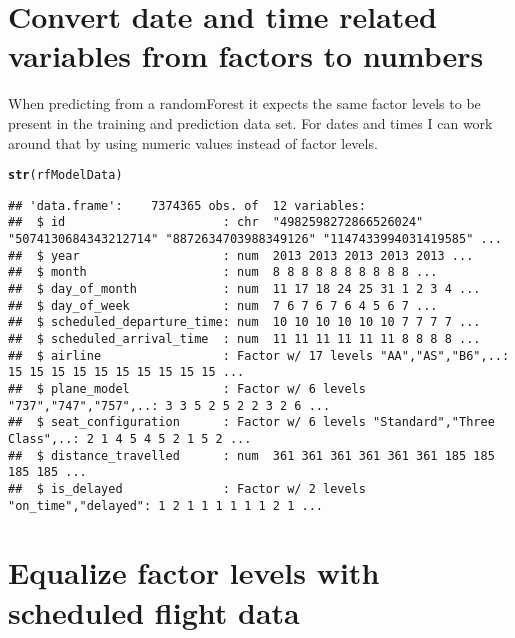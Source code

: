 \documentclass{article}\usepackage[]{graphicx}\usepackage[]{color}
\makeatletter
\newcommand{\hlstd}[1]{\textcolor[rgb]{0.345,0.345,0.345}{#1}}%
\newcommand{\hlkwd}[1]{\textcolor[rgb]{0.737,0.353,0.396}{\textbf{#1}}}%
\newenvironment{kframe}{%
 \def\at@end@of@kframe{}%
 \ifinner\ifhmode%
  \def\at@end@of@kframe{\end{minipage}}%
  \begin{minipage}{\columnwidth}%
 \fi\fi%
 \def\FrameCommand##1{\hskip\@totalleftmargin \hskip-\fboxsep
 \colorbox{shadecolor}{##1}\hskip-\fboxsep
     \hskip-\linewidth \hskip-\@totalleftmargin \hskip\columnwidth}%
 \MakeFramed {\advance\hsize-\width
   \@totalleftmargin\z@ \linewidth\hsize
   \@setminipage}}%
 {\par\unskip\endMakeFramed%
 \at@end@of@kframe}
\newenvironment{knitrout}{}{} %
\makeatother
\begin{document}
\section{Convert date and time related variables from factors to numbers}
When predicting from a randomForest it expects the same factor levels to be present in the training and prediction data set. For dates and times I can work around that by using numeric values instead of factor levels.

\begin{knitrout}
\color{fgcolor}\begin{kframe}
\begin{alltt}
\hlkwd{str}\hlstd{(rfModelData)}
\end{alltt}
\begin{verbatim}
## 'data.frame':	7374365 obs. of  12 variables:
##  $ id                      : chr  "4982598272866526024" "5074130684343212714" "8872634703988349126" "1147433994031419585" ...
##  $ year                    : num  2013 2013 2013 2013 2013 ...
##  $ month                   : num  8 8 8 8 8 8 8 8 8 8 ...
##  $ day_of_month            : num  11 17 18 24 25 31 1 2 3 4 ...
##  $ day_of_week             : num  7 6 7 6 7 6 4 5 6 7 ...
##  $ scheduled_departure_time: num  10 10 10 10 10 10 7 7 7 7 ...
##  $ scheduled_arrival_time  : num  11 11 11 11 11 11 8 8 8 8 ...
##  $ airline                 : Factor w/ 17 levels "AA","AS","B6",..: 15 15 15 15 15 15 15 15 15 15 ...
##  $ plane_model             : Factor w/ 6 levels "737","747","757",..: 3 3 5 2 5 2 2 3 2 6 ...
##  $ seat_configuration      : Factor w/ 6 levels "Standard","Three Class",..: 2 1 4 5 4 5 2 1 5 2 ...
##  $ distance_travelled      : num  361 361 361 361 361 361 185 185 185 185 ...
##  $ is_delayed              : Factor w/ 2 levels "on_time","delayed": 1 2 1 1 1 1 1 1 2 1 ...
\end{verbatim}
\end{kframe}
\end{knitrout}

\section{Equalize factor levels with scheduled flight data}
\end{document}
